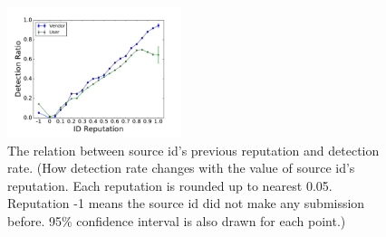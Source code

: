 

\begin{figure}[t!]
\begin{center}
\includegraphics[width=2in]{figure/IDReputation}
\caption{The relation between source id's previous reputation and detection rate.
(How detection rate changes with the value of source id's reputation. 
Each reputation is rounded up to nearest 0.05.
Reputation -1 means the source id did not make any submission before. 
95\% confidence interval is also drawn 
for each point.)
}
\label{fig:idreputation}
\end{center}
\end{figure}
